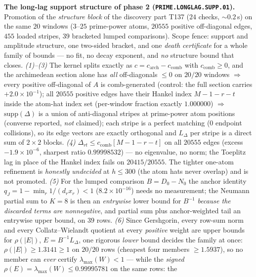 \par\smallskip\noindent\textbf{The long-lag support structure of phase 2
(\texttt{PRIME.LONGLAG.SUPP.01}).}
Promotion of the \emph{structure block} of the discovery part T137 ($24$ checks,
${\sim}0.2$\,s) on the same $20$ windows ($3$--$25$ prime-power atoms, $20555$
positive off-diagonal edges, $455$ loaded stripes, $39$ bracketed lumped
comparisons). Scope fence: support and amplitude structure, one two-sided
bracket, and one \emph{death certificate} for a whole family of bounds --- no
fit, no decay exponent, and \emph{no} structure bound that closes.
\emph{(1)--(3)} The kernel splits exactly as
$c=c_{\mathrm{arch}}-c_{\mathrm{comb}}$ with $c_{\mathrm{comb}}\ge0$, and the
archimedean section alone has \emph{all} off-diagonals $\le0$ on $20/20$ windows
$\Rightarrow$ every positive off-diagonal of $A$ is comb-generated (control: the
full section carries $+2.0\times10^{-1}$); all $20555$ positive edges have their
Hankel index $M-1-r-t$ inside the atom-hat index set (per-window fraction exactly
$1.000000$) $\Rightarrow$ $\mathrm{supp}(\Delta)$ is a union of anti-diagonal
stripes at prime-power atom positions (converse reported, \emph{not} claimed);
each stripe is a perfect matching ($0$ endpoint collisions), so its edge vectors
are exactly orthogonal and $L_\Delta$ per stripe is a direct sum of $2\times2$
blocks.
\emph{(4)} $\Delta_{rt}\le c_{\mathrm{comb}}[M-1-r-t]$ on all $20555$ edges
(excess $-1.9\times10^{-6}$, sharpest ratio $0.99998532$) --- no eigenvalue, no
norm; the Toeplitz lag in place of the Hankel index fails on $20415/20555$. The
tighter one-atom refinement is \emph{honestly undecided} at $h\le300$ (the atom
hats never overlap) and is not promoted.
\emph{(5)} For the lumped comparison $B=D_0-N_0$ the anchor identity
$q_J=1-\min_r1/(d_rx_r)<1$ ($8.2\times10^{-16}$) needs no measurement; the
Neumann partial sum to $K=8$ is then an \emph{entrywise} lower bound for $B^{-1}$
\emph{because the discarded terms are nonnegative}, and partial sum plus
anchor-weighted tail an entrywise upper bound, on $39$ rows.
\emph{(6)} Since Gershgorin, every row-sum norm and every Collatz--Wielandt
quotient at every \emph{positive} weight are upper bounds for $\rho(|E|)$,
$E=B^{-1}L_\Delta$, one rigorous \emph{lower} bound decides the family at once:
$\rho(|E|)\ge1.3141\ge1$ on $20/20$ rows (cheapest four members $\ge1.5937$), so
no member can \emph{ever} certify $\lambda_{\max}(W)<1$ --- while the
\emph{signed} $\rho(E)=\lambda_{\max}(W)\le0.99995781$ on the same rows: the
